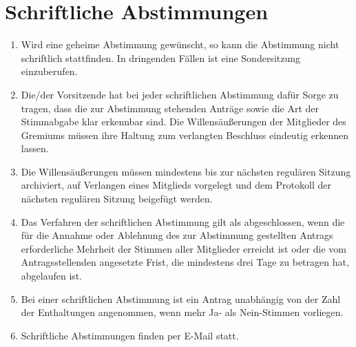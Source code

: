 \section{Schriftliche Abstimmungen}
\label{sec:schriftlich}
\begin{enumerate}
	\item Wird eine geheime Abstimmung gewünscht, so kann die Abstimmung nicht schriftlich stattfinden.
	In dringenden Fällen ist eine Sondersitzung einzuberufen.
	\item Die/der Vorsitzende hat bei jeder schriftlichen Abstimmung dafür Sorge zu tragen, dass die zur Abstimmung stehenden Anträge sowie die Art der Stimmabgabe klar erkennbar sind.
	Die Willensäußerungen der Mitglieder des Gremiums müssen ihre Haltung zum verlangten Beschluss eindeutig erkennen lassen.
	\item Die Willensäußerungen müssen mindestens bis zur nächsten regulären Sitzung archiviert, auf Verlangen eines Mitglieds vorgelegt und dem Protokoll der nächsten regulären Sitzung beigefügt werden.
	\item Das Verfahren
	der schriftlichen Abstimmung gilt als abgeschlossen, wenn die für die Annahme oder
	Ablehnung des zur Abstimmung gestellten Antrags erforderliche Mehrheit der Stimmen
	aller Mitglieder erreicht ist oder die vom Antragsstellenden angesetzte Frist, die
	mindestens drei Tage zu betragen hat, abgelaufen ist.
	\item Bei einer schriftlichen Abstimmung ist ein Antrag unabhängig von der Zahl der Enthaltungen angenommen, wenn mehr Ja- als Nein-Stimmen vorliegen.
	\item Schriftliche Abstimmungen finden per E-Mail statt.
\end{enumerate}

